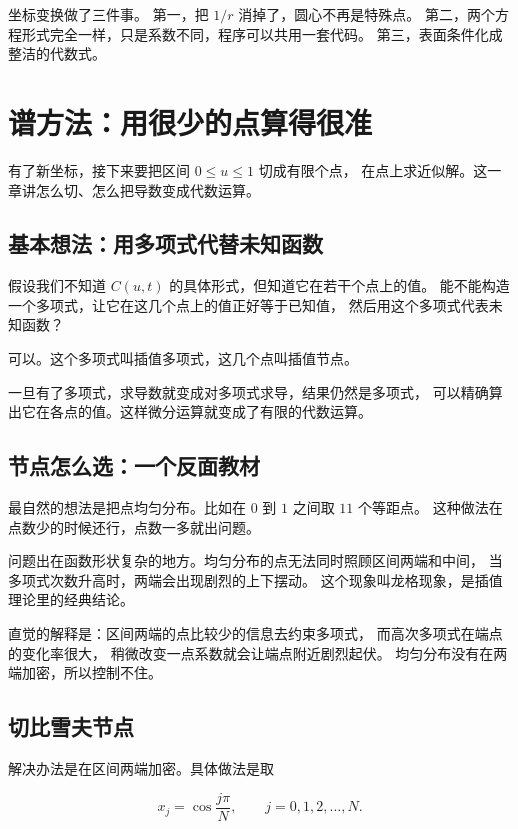 \keypoint
坐标变换做了三件事。
第一，把 $1/r$ 消掉了，圆心不再是特殊点。
第二，两个方程形式完全一样，只是系数不同，程序可以共用一套代码。
第三，表面条件化成整洁的代数式。

\section{谱方法：用很少的点算得很准}

有了新坐标，接下来要把区间 $0\le u\le1$ 切成有限个点，
在点上求近似解。这一章讲怎么切、怎么把导数变成代数运算。

\subsection{基本想法：用多项式代替未知函数}

假设我们不知道 $C(u,t)$ 的具体形式，但知道它在若干个点上的值。
能不能构造一个多项式，让它在这几个点上的值正好等于已知值，
然后用这个多项式代表未知函数？

可以。这个多项式叫插值多项式，这几个点叫插值节点。

一旦有了多项式，求导数就变成对多项式求导，结果仍然是多项式，
可以精确算出它在各点的值。这样微分运算就变成了有限的代数运算。

\subsection{节点怎么选：一个反面教材}

最自然的想法是把点均匀分布。比如在 $0$ 到 $1$ 之间取 $11$ 个等距点。
这种做法在点数少的时候还行，点数一多就出问题。

问题出在函数形状复杂的地方。均匀分布的点无法同时照顾区间两端和中间，
当多项式次数升高时，两端会出现剧烈的上下摆动。
这个现象叫龙格现象，是插值理论里的经典结论。

直觉的解释是：区间两端的点比较少的信息去约束多项式，
而高次多项式在端点的变化率很大，
稍微改变一点系数就会让端点附近剧烈起伏。
均匀分布没有在两端加密，所以控制不住。

\subsection{切比雪夫节点}

解决办法是在区间两端加密。具体做法是取

\begin{equation}
x_j = \cos\frac{j\pi}{N}, \qquad j=0,1,2,\dots,N .
\label{eq:chebnode}
\end{equation}

